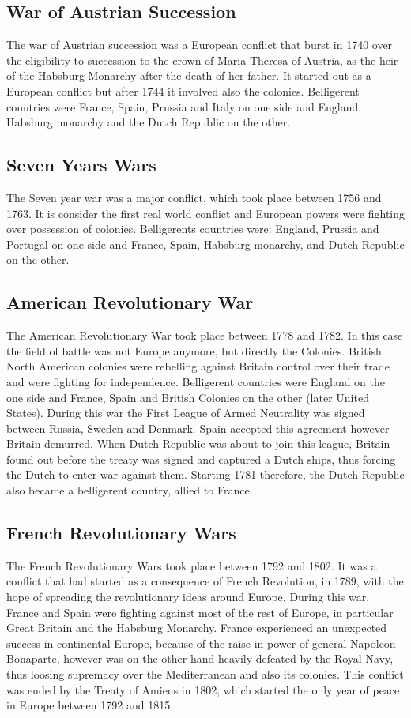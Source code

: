 \documentclass[12pt,a4paper,notitlepage,english]{article}
\begin{document}
\subsection{War of Austrian Succession}
The war of Austrian succession was a European conflict that burst in 1740 over the eligibility to succession to the crown of Maria Theresa of Austria, as the heir of the Habsburg Monarchy after the death of her father. It started out as a European conflict but after 1744 it involved also the colonies. Belligerent countries were France, Spain, Prussia and Italy on one side and England, Habsburg monarchy and the Dutch Republic on the other. 

\subsection{Seven Years Wars}
The Seven year war was a major conflict, which took place between 1756 and 1763. It is consider the first real world conflict and European powers were fighting over possession of colonies. Belligerents countries were: England, Prussia and Portugal on one side and France, Spain, Habsburg monarchy, and Dutch Republic on the other. 

\subsection{American Revolutionary War}
The American Revolutionary War took place between 1778 and 1782. In this case the field of battle was not Europe anymore, but directly the Colonies. British North American colonies were rebelling against Britain control over their trade and were fighting for independence. Belligerent countries were England on the one side and France, Spain and British Colonies on the other (later United States). During this war the First League of Armed Neutrality was signed between Russia, Sweden and Denmark. Spain accepted this agreement however Britain demurred. When Dutch Republic was about to join this league, Britain found out before the treaty was signed and captured a Dutch ships, thus forcing the Dutch to enter war against them. Starting 1781 therefore, the Dutch Republic also became a belligerent country, allied to France. 

\subsection{French Revolutionary Wars}
The French Revolutionary Wars took place between 1792 and 1802. It was a conflict that had started as a consequence of French Revolution, in 1789, with the hope of spreading the revolutionary ideas around Europe. During this war, France and Spain were fighting against most of the rest of Europe, in particular Great Britain and the Habsburg Monarchy. France experienced an unexpected success in continental Europe, because of the raise in power of general Napoleon Bonaparte, however was on the other hand heavily defeated by the Royal Navy, thus loosing supremacy over the Mediterranean and also its colonies. This conflict was ended by the Treaty of Amiens in 1802, which started the only year of peace in Europe between 1792 and 1815.
\end{document}
